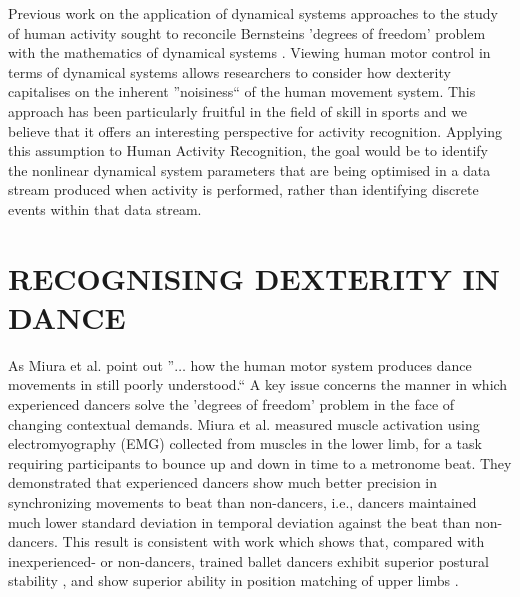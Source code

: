 \documentclass{sigchi}
\begin{document}
Previous work on the application of dynamical systems approaches to the study of human activity sought to 
reconcile Bernsteins  \cite{Bernstein1967} 'degrees of freedom' problem with the mathematics 
of dynamical systems \cite{Kugler1982}.
Viewing human motor control in terms of 
dynamical systems allows researchers to consider how dexterity capitalises on the inherent ''noisiness`` of the human 
movement system. This approach has been particularly fruitful in the field of skill in sports \cite{Davids2003}
and we believe that it offers an interesting perspective for activity recognition. 
Applying this assumption to Human Activity Recognition, the goal would be to identify 
the nonlinear dynamical system parameters that are being 
optimised in a data stream produced when activity is performed, rather than identifying 
discrete events within that data stream. 
 

\section{RECOGNISING DEXTERITY IN DANCE }
As Miura et al. \cite{Miura2015} point out ''$\ldots$ how the human motor system produces dance movements in still 
poorly understood.`` A key issue concerns the manner in which experienced dancers solve the 'degrees of freedom' 
problem in the face of changing contextual demands.  Miura et al. \cite{Miura2013} measured muscle activation 
using electromyography (EMG) collected from muscles in the lower limb, for a task requiring participants to 
bounce up and down in time to a metronome beat.  They demonstrated that experienced dancers show much better 
precision in synchronizing movements to beat than non-dancers, i.e., dancers maintained much lower standard 
deviation in temporal deviation against the beat than non-dancers. This result is consistent with work which 
shows that, compared with inexperienced- or non-dancers, trained ballet dancers exhibit superior postural 
stability \cite{Crotts1996} %
, and show superior ability in position matching of upper limbs \cite{Ramsay2001}.%
\end{document}
